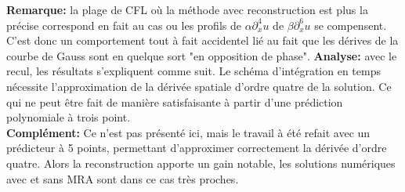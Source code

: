 \textbf{Remarque:} la plage de CFL où la méthode avec reconstruction est plus la précise correspond en fait au cas ou les profils de $ \alpha \partial_x^4 u$
de $\beta \partial_x^6 u$ se compensent. C'est donc un comportement tout à fait accidentel lié au fait que les dérives de la courbe de Gauss sont en quelque sort "en opposition de phase".
\textbf{Analyse:} avec le recul, les résultats s'expliquent comme suit. Le schéma d'intégration en temps nécessite l'approximation de la dérivée spatiale d'ordre quatre de la solution.
Ce qui ne peut être fait de manière satisfaisante à partir d'une prédiction polynomiale à trois point.\\
\textbf{Complément:} Ce n'est pas présenté ici, mais le travail à été refait avec un prédicteur à 5 points, permettant d'approximer correctement la dérivée d'ordre quatre.
Alors la reconstruction apporte un gain notable, les solutions numériques avec et sans MRA sont dans ce cas très proches.